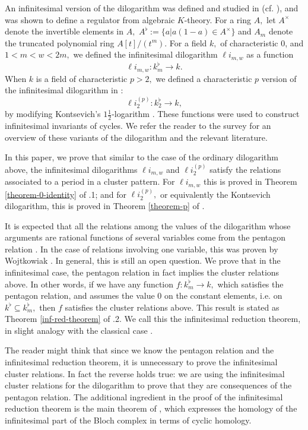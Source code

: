 \documentclass{amsart}
\theoremstyle{definition}
\numberwithin{equation}{subsection}
\begin{document}
An infinitesimal version of the dilogarithm was defined and studied in \cite{u1} (cf. \cite[]{inf-dilog}), and was shown to define a regulator from  algebraic $K$-theory. For a ring $A, $ let $A^{\times}$ denote the invertible elements in $A,$  $A^{\flat}:=\{a| a(1-a) \in A^{\times} \}$ and $A_{m}$ denote the truncated polynomial ring $A[t]/(t^m).$  For a field $k,$ of characteristic 0, and  $1<m<w<2m,$ we defined the infinitesimal dilogarithm  $\ell i _{m,w}$ as a function 
$$
\ell i _{m,w}:  k_{m} ^{\flat} \to k.
$$ 
When $k$ is a field of characteristic $p>2,$  we defined a characteristic $p$ version of the infinitesimal dilogarithm in \cite{uao}: 
$$
\ell i_{2} ^{(p)}:k_{2}^{\flat} \to k,
$$
by modifying Kontsevich's $1\frac{1}{2}$-logarithm \cite{kont}. These functions were used to construct infinitesimal invariants of cycles. We refer the reader to the survey \cite{survey} for an overview of these variants of the dilogarithm and the relevant literature.   



In this paper, we prove that similar to the case of the ordinary dilogarithm above, the infinitesimal dilogarithms  $\ell i_{m,w}$ and $\ell i_{2} ^{(p)}$ satisfy the relations associated to a period in a cluster pattern. For $\ell i_{m,w}$ this is proved  in Theorem \ref{theorem-0-identity} of .1; and for $\ell i_{2} ^{(p)},$ or equivalently the Kontsevich dilogarithm, this is proved in Theorem \ref{theorem-p} of .





It is expected that  all the relations among the values of the dilogarithm whose arguments are  rational functions of several variables come from the pentagon relation  \cite{zag}. In the case of relations involving one variable, this was proven by Wojtkowiak \cite[Theorem 4.4]{wojt}. In  general, this is still an open question.  We prove that in the infinitesimal case, the pentagon relation in fact implies the cluster  relations above. In other words, if we have any function $f:k_{m} ^{\flat} \to k,$ which satisfies the pentagon relation, and assumes the value 0 on the constant elements, i.e. on $k^{\flat} \subseteq k_{m} ^{\flat},$ then $f$ satisfies the cluster  relations above.  This result is stated as Theorem \ref{inf-red-theorem} of .2. We call this the infinitesimal reduction theorem, in slight analogy with the classical case \cite{nak}. 

The reader might think that since we know the pentagon relation and the infinitesimal reduction theorem, it is unnecessary to prove the infinitesimal cluster relations. In fact the reverse holds true: we are using the infinitesimal cluster relations for the dilogarithm  to prove that they are consequences of the pentagon relation. The additional ingredient in the proof of the infinitesimal reduction theorem is the  main theorem of \cite{u1}, which expresses the homology of the infinitesimal part of the Bloch complex in terms of cyclic homology.  
\end{document}
